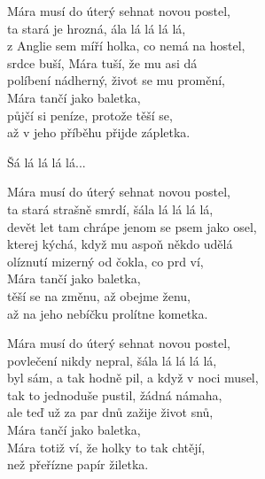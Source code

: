 \pagestyle{empty}

\vspace{-2 pt}
\ve{}
Mára musí do úterý sehnat novou postel,\\
ta stará je hrozná, ála lá lá lá lá,\\
z Anglie sem míří holka, co nemá na hostel,\\
srdce buší, Mára tuší, že mu asi dá\\
políbení nádherný, život se mu promění,\\
Mára tančí jako baletka,\\
půjčí si peníze, protože těší se,\\
až v jeho příběhu přijde zápletka.

\vspace{-2 pt}
\cho{}
Šá lá lá lá lá...

\vspace{-2 pt}
\ve{}
Mára musí do úterý sehnat novou postel,\\
ta stará strašně smrdí, šála lá lá lá lá,\\
devět let tam chrápe jenom se psem jako osel,\\
kterej kýchá, když mu aspoň někdo udělá\\
olíznutí mizerný od čokla, co prd ví,\\
Mára tančí jako baletka,\\
těší se na změnu, až obejme ženu,\\
až na jeho nebíčku prolítne kometka.

\vspace{-2 pt}
\cho{}

\vspace{-2 pt}
\ve{}
Mára musí do úterý sehnat novou postel,\\
povlečení nikdy nepral, šála lá lá lá lá,\\
byl sám, a tak hodně pil, a když v noci musel,\\
tak to jednoduše pustil, žádná námaha,\\
ale teď už za par dnů zažije život snů,\\
Mára tančí jako baletka,\\
Mára totiž ví, že holky to tak chtějí,\\
než přeřízne papír žiletka. 

\vspace{-2 pt}
\cho{}

